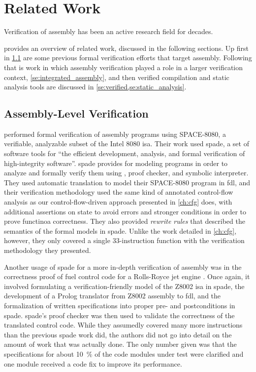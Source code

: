 \chapter{Related Work}\label{ch:related}
Verification of assembly has been an active research field for decades.

 provides an overview of related work,
discussed in the following sections.
Up first in \cref{se:previous_assembly}
are some previous formal verification efforts that target assembly.
Following that is work in which assembly verification played a role
in a larger verification context, \cref{se:integrated_assembly},
and then verified compilation and static analysis tools are discussed
in \cref{se:verified,se:static_analysis}.

\section{Assembly-Level Verification}\label{se:previous_assembly}
\textcite{clutterbuck1988verification} performed formal verification
of assembly programs using SPACE-8080, a verifiable,
analyzable subset of the Intel 8080 \ac{isa}.
Their work used \ac{spade}\autocite{carre1986spade},
a set of software tools for ``the efficient development,
analysis, and formal verification of high-integrity software''.
\Ac{spade} provides  for modeling programs
in order to analyze and formally verify them
using , proof checker, and symbolic interpreter.
They used automatic translation to model their SPACE-8080 program
in \ac{fdl}, and their verification methodology used the same kind of
annotated control-flow analysis as our control-flow-driven approach
presented in \cref{ch:cfg} does, with additional assertions on state to avoid errors
and stronger conditions in order to prove functinoa correctness.
They also provided \emph{rewrite rules} that described the semantics
of the formal models in \ac{spade}. Unlike the work detailed in \cref{ch:cfg}, however,
they only covered a single 33-instruction function
with the verification methodology they presented.

Another usage of \ac{spade} for a more in-depth verification of assembly
was in the correctness proof of fuel control code for a Rolls-Royce
jet engine \autocite{oneill1988verification}. Once again,
it involved formulating a verification-friendly model of the Z8002 \ac{isa}
in \ac{spade}, the development of a Prolog translator from Z8002 assembly to \ac{fdl},
and the formalization of written specifications into proper pre- and postconditions
in \ac{spade}. \Ac{spade}'s proof checker was then used to validate the correctness
of the translated control code. While they assumedly covered many more instructions
than the previous \ac{spade} work did, the authors did not go into detail
on the amount of work that was actually done.
The only number given was that the specifications for about \SI{10}{\percent}
of the code modules under test were clarified
and one module received a code fix to improve its performance.

